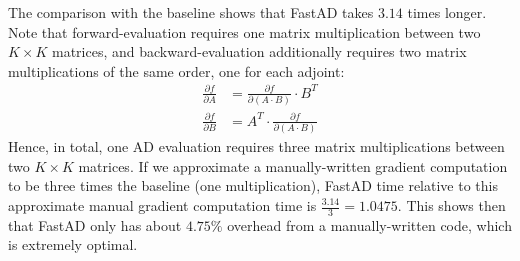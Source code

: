 The comparison with the baseline shows that FastAD takes $ 3.14$ times longer.
Note that forward-evaluation requires one matrix multiplication between two $K\times K$ matrices,
and backward-evaluation additionally requires two matrix multiplications of the same order,
one for each adjoint:
\begin{align*}
    \frac{\partial f}{\partial A} 
    &= \frac{\partial f}{\partial (A\cdot B)} \cdot B^T \\
    \frac{\partial f}{\partial B} 
    &= A^T \cdot \frac{\partial f}{\partial (A\cdot B)}
\end{align*}
Hence, in total, one AD evaluation requires three matrix multiplications between two $K\times K$ matrices.
If we approximate a manually-written gradient computation to be
three times the baseline (one multiplication), FastAD time relative to this approximate manual gradient computation time
is $\frac{3.14}{3} = 1.0475$.
This shows then that FastAD only has about $ 4.75\%$ overhead 
from a manually-written code, which is extremely optimal.
